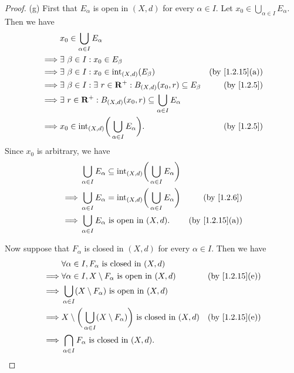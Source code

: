 \begin{proof}{(g)}
  First that \(E_\alpha\) is open in \((X, d)\) for every \(\alpha \in I\).
  Let \(x_0 \in \bigcup_{\alpha \in I} E_\alpha\).
  Then we have
  \begin{align*}
             & x_0 \in \bigcup_{\alpha \in I} E_\alpha                                                                           \\
    \implies & \exists\ \beta \in I : x_0 \in E_\beta                                                                            \\
    \implies & \exists\ \beta \in I : x_0 \in \text{int}_{(X, d)}(E_\beta)                        & \text{(by \cref{1.2.15}(a))} \\
    \implies & \exists\ \beta \in I : \exists\ r \in \R^+ : B_{(X, d)}(x_0, r) \subseteq E_\beta  & \text{(by \cref{1.2.5})}     \\
    \implies & \exists\ r \in \R^+ : B_{(X, d)}(x_0, r) \subseteq \bigcup_{\alpha \in I} E_\alpha                                \\
    \implies & x_0 \in \text{int}_{(X, d)}\bigg(\bigcup_{\alpha \in I} E_\alpha\bigg).            & \text{(by \cref{1.2.5})}
  \end{align*}
  Since \(x_0\) is arbitrary, we have
  \begin{align*}
             & \bigcup_{\alpha \in I} E_\alpha \subseteq \text{int}_{(X, d)}\bigg(\bigcup_{\alpha \in I} E_\alpha\bigg)                                \\
    \implies & \bigcup_{\alpha \in I} E_\alpha = \text{int}_{(X, d)}\bigg(\bigcup_{\alpha \in I} E_\alpha\bigg)         & \text{(by \cref{1.2.6})}     \\
    \implies & \bigcup_{\alpha \in I} E_\alpha \text{ is open in } (X, d).                                              & \text{(by \cref{1.2.15}(a))}
  \end{align*}

  Now suppose that \(F_\alpha\) is closed in \((X, d)\) for every \(\alpha \in I\).
  Then we have
  \begin{align*}
             & \forall \alpha \in I, F_\alpha \text{ is closed in } (X, d)                                                                       \\
    \implies & \forall \alpha \in I, X \setminus F_\alpha \text{ is open in } (X, d)                              & \text{(by \cref{1.2.15}(e))} \\
    \implies & \bigcup_{\alpha \in I} (X \setminus F_\alpha) \text{ is open in } (X, d)                                                          \\
    \implies & X \setminus \bigg(\bigcup_{\alpha \in I} (X \setminus F_\alpha)\bigg) \text{ is closed in } (X, d) & \text{(by \cref{1.2.15}(e))} \\
    \implies & \bigcap_{\alpha \in I} F_\alpha \text{ is closed in } (X, d).
  \end{align*}
\end{proof}

